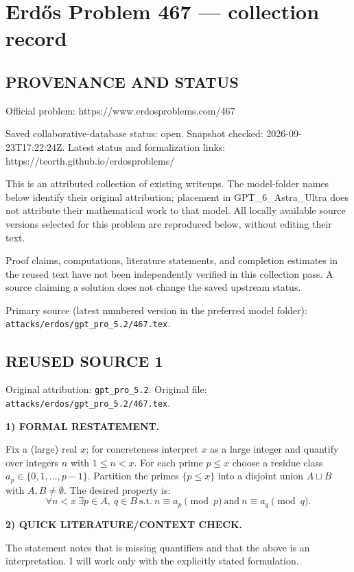 \section*{Erd\H{o}s Problem 467 --- collection record}

\subsection*{PROVENANCE AND STATUS}
Official problem: https://www.erdosproblems.com/467

Saved collaborative-database status: open.
Snapshot checked: 2026-09-23T17:22:24Z.
Latest status and formalization links: https://teorth.github.io/erdosproblems/

This is an attributed collection of existing writeups. The model-folder names below identify their original attribution; placement in GPT\_6\_Astra\_Ultra does not attribute their mathematical work to that model. All locally available source versions selected for this problem are reproduced below, without editing their text.

Proof claims, computations, literature statements, and completion estimates in the reused text have not been independently verified in this collection pass. A source claiming a solution does not change the saved upstream status.

Primary source (latest numbered version in the preferred model folder): \texttt{attacks/erdos/gpt\_pro\_5.2/467.tex}.

\subsection*{REUSED SOURCE 1}
Original attribution: \texttt{gpt\_pro\_5.2}.
Original file: \texttt{attacks/erdos/gpt\_pro\_5.2/467.tex}.


\noindent\textbf{1) FORMAL RESTATEMENT.}

Fix a (large) real $x$; for concreteness interpret $x$ as a large integer and quantify over integers $n$ with $1\le n<x$. For each prime $p\le x$ choose a residue class $a_p\in\{0,1,\dots,p-1\}$. Partition the primes $\{p\le x\}$ into a disjoint union $A\sqcup B$ with $A,B\ne\emptyset$. The desired property is:
\[
\forall n<x\ \exists p\in A,\ q\in B\ \text{s.t.}\ n\equiv a_p\pmod p\ \text{and}\ n\equiv a_q\pmod q.
\]

\medskip
\noindent\textbf{2) QUICK LITERATURE/CONTEXT CHECK.}

The statement notes that \cite{ErGr80} is missing quantifiers and that the above is an interpretation. I will work only with the explicitly stated formulation.

